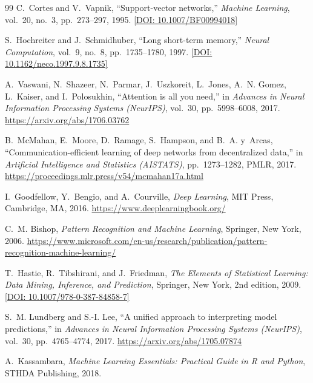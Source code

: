 \documentclass[12pt,a4paper,oneside]{report}
\begin{document}
\begin{thebibliography}{99}
C.~Cortes and V.~Vapnik,
\newblock ``Support-vector networks,''
\newblock \emph{Machine Learning}, vol.~20, no.~3, pp.~273--297, 1995. \href{https://doi.org/10.1007/BF00994018}{[DOI: 10.1007/BF00994018]}

S.~Hochreiter and J.~Schmidhuber,
\newblock ``Long short-term memory,''
\newblock \emph{Neural Computation}, vol.~9, no.~8, pp.~1735--1780, 1997. \href{https://doi.org/10.1162/neco.1997.9.8.1735}{[DOI: 10.1162/neco.1997.9.8.1735]}

A.~Vaswani, N.~Shazeer, N.~Parmar, J.~Uszkoreit, L.~Jones, A.~N. Gomez, L.~Kaiser, and I.~Polosukhin,
\newblock ``Attention is all you need,''
\newblock in \emph{Advances in Neural Information Processing Systems (NeurIPS)}, vol.~30, pp.~5998--6008, 2017. \url{https://arxiv.org/abs/1706.03762}

B.~McMahan, E.~Moore, D.~Ramage, S.~Hampson, and B.~A. y~Arcas,
\newblock ``Communication-efficient learning of deep networks from decentralized data,''
\newblock in \emph{Artificial Intelligence and Statistics (AISTATS)}, pp.~1273--1282, PMLR, 2017. \url{https://proceedings.mlr.press/v54/mcmahan17a.html}

I.~Goodfellow, Y.~Bengio, and A.~Courville,
\newblock \emph{Deep Learning},
\newblock MIT Press, Cambridge, MA, 2016. \url{https://www.deeplearningbook.org/}

C.~M. Bishop,
\newblock \emph{Pattern Recognition and Machine Learning},
\newblock Springer, New York, 2006. \url{https://www.microsoft.com/en-us/research/publication/pattern-recognition-machine-learning/}

T.~Hastie, R.~Tibshirani, and J.~Friedman,
\newblock \emph{The Elements of Statistical Learning: Data Mining, Inference, and Prediction},
\newblock Springer, New York, 2nd edition, 2009. \href{https://doi.org/10.1007/978-0-387-84858-7}{[DOI: 10.1007/978-0-387-84858-7]}

S.~M. Lundberg and S.-I. Lee,
\newblock ``A unified approach to interpreting model predictions,''
\newblock in \emph{Advances in Neural Information Processing Systems (NeurIPS)}, vol.~30, pp.~4765--4774, 2017. \url{https://arxiv.org/abs/1705.07874}

A.~Kassambara,
\newblock \emph{Machine Learning Essentials: Practical Guide in R and Python},
\newblock STHDA Publishing, 2018.


\end{thebibliography}
\end{document}
